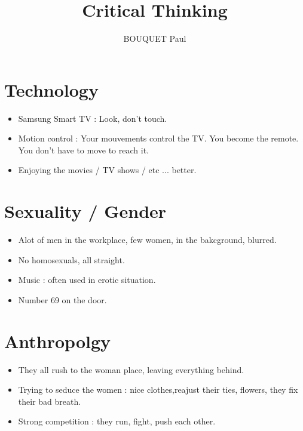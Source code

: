 \documentclass{article}
\title{Critical Thinking}
\author{BOUQUET Paul}
\date{\vspace{-5ex}}
\begin{document}
\maketitle

\section{Technology}

\begin{itemize}

\item Samsung Smart TV : Look, don't touch.

\item Motion control : Your mouvements control the TV. You become the remote.
You don't have to move to reach it.

\item Enjoying the movies / TV shows / etc ... better.

\end{itemize}

\section{Sexuality / Gender}

\begin{itemize}

\item Alot of men in the workplace, few women, in the bakcground, blurred.

\item No homosexuals, all straight.

\item Music : often used in erotic situation.

\item Number 69 on the door.

\end{itemize}

\section{Anthropolgy}

\begin{itemize}

\item They all rush to the woman place, leaving everything behind.

\item Trying to seduce the women : nice clothes,reajust their ties, flowers, they fix their bad breath.

\item Strong competition : they run, fight, push each other.

\end{itemize}
\end{document}
